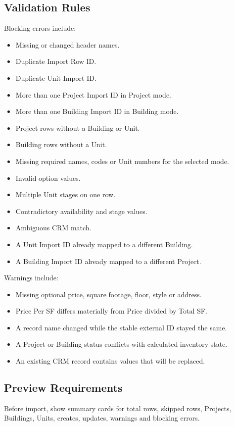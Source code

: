 \documentclass[10pt]{article}
\begin{document}
\subsection{Validation Rules}
Blocking errors include:
\begin{itemize}
\item Missing or changed header names.
\item Duplicate Import Row ID.
\item Duplicate Unit Import ID.
\item More than one Project Import ID in Project mode.
\item More than one Building Import ID in Building mode.
\item Project rows without a Building or Unit.
\item Building rows without a Unit.
\item Missing required names, codes or Unit numbers for the selected mode.
\item Invalid option values.
\item Multiple Unit stages on one row.
\item Contradictory availability and stage values.
\item Ambiguous CRM match.
\item A Unit Import ID already mapped to a different Building.
\item A Building Import ID already mapped to a different Project.
\end{itemize}

Warnings include:
\begin{itemize}
\item Missing optional price, square footage, floor, style or address.
\item Price Per SF differs materially from Price divided by Total SF.
\item A record name changed while the stable external ID stayed the same.
\item A Project or Building status conflicts with calculated inventory state.
\item An existing CRM record contains values that will be replaced.
\end{itemize}

\subsection{Preview Requirements}
Before import, show summary cards for total rows, skipped rows, Projects, Buildings, Units, creates, updates, warnings and blocking errors.
\end{document}
